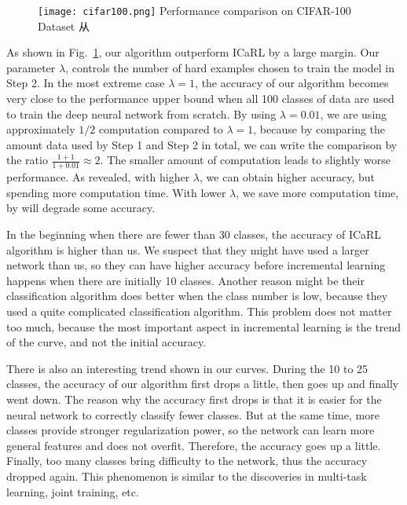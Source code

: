 \begin{figure}[!htp]
	\centering
	\texttt{[image: cifar100.png]}
	{Performance comparison on CIFAR-100 Dataset}
	\label{fig:cifar100}从
\end{figure}


As shown in Fig.~\ref{fig:cifar100}, our algorithm outperform ICaRL by a large margin. Our parameter $\lambda$, controls the number of hard examples chosen to train the model in Step 2. In the most extreme case $\lambda = 1$, the accuracy of our algorithm becomes very close to the performance upper bound when all 100 classes of data are used to train the deep neural network from scratch. By using $\lambda=0.01$, we are using approximately $1/2$ computation compared to $\lambda=1$, because by comparing the amount data used by Step 1 and Step 2 in total, we can write the comparison by the ratio $\frac{1+1}{1+0.01} \approx 2$. The smaller amount of computation leads to slightly worse performance. As revealed, with higher $\lambda$, we can obtain higher accuracy, but spending more computation time. With lower $\lambda$, we save more computation time, by will degrade some accuracy.

In the beginning when there are fewer than 30 classes, the accuracy of ICaRL algorithm is higher than us. We suspect that they might have used a larger network than us, so they can have higher accuracy before incremental learning happens when there are initially 10 classes. Another reason might be their classification algorithm does better when the class number is low, because they used a quite complicated classification algorithm. This problem does not matter too much, because the most important aspect in incremental learning is the trend of the curve, and not the initial accuracy.

There is also an interesting trend shown in our curves. During the 10 to 25 classes, the accuracy of our algorithm first drops a little, then goes up and finally went down. The reason why the accuracy first drops is that it is easier for the neural network to correctly classify fewer classes. But at the same time, more classes provide stronger regularization power, so the network can learn more general features and does not overfit. Therefore, the accuracy goes up a little. Finally, too many classes bring difficulty to the network, thus the accuracy dropped again. This phenomenon is similar to the discoveries in multi-task learning, joint training, etc. 

